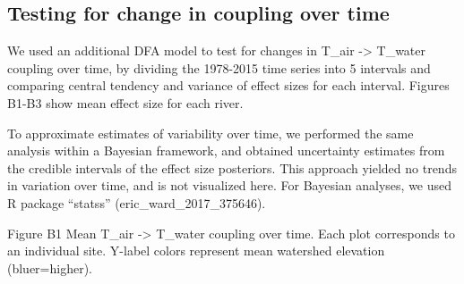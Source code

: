 \subsection*{Testing for change in coupling over time}

We used an additional DFA model to test for changes in T_{air} -> T_{water} coupling over time, by dividing the 1978-2015 time series into 5 intervals and comparing central tendency and variance of effect sizes for each interval. Figures B1-B3 show mean effect size for each river.

To approximate estimates of variability over time, we performed the same analysis within a Bayesian framework, and obtained uncertainty estimates from the credible intervals of the effect size posteriors. This approach yielded no trends in variation over time, and is not visualized here. For Bayesian analyses, we used R package ``statss'' (eric_ward_2017_375646).

\begin{center}
\end{center}
Figure B1 Mean T_{air} -> T_{water} coupling over time. Each plot corresponds to an individual site. Y-label colors represent mean watershed elevation (bluer=higher).

